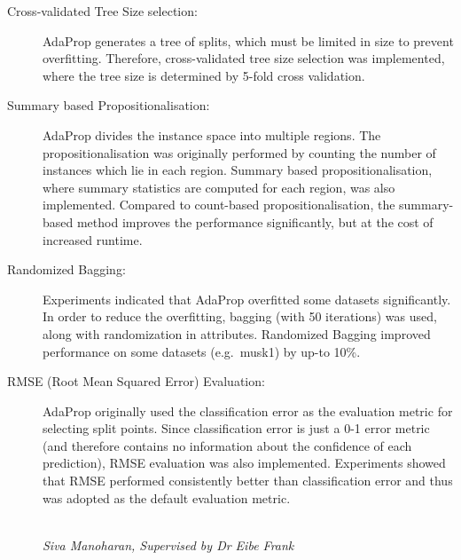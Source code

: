 \documentclass[a4paper,12pt]{article} %
\begin{document}
\begin{description}
    \item[Cross-validated Tree Size selection:]
        AdaProp generates a tree of splits, 
            which must be limited in size to prevent
            overfitting.
        Therefore, 
            cross-validated tree size selection was implemented, 
            where the tree size is determined by 
            5-fold cross validation.
            
    \item[Summary based Propositionalisation:]
        AdaProp divides the instance space into multiple regions. 
        The propositionalisation was originally
            performed by counting the number of instances which 
            lie in each region.
        Summary based propositionalisation, 
            where summary statistics are computed for each region,
            was also implemented.
        Compared to count-based propositionalisation, 
            the summary-based method
            improves the performance significantly, 
            but at the cost of increased runtime.
            
    \item[Randomized Bagging:]
        Experiments indicated that 
            AdaProp overfitted some datasets significantly.
        In order to reduce the overfitting, 
            bagging (with 50 iterations) was used, 
            along with randomization in attributes.
        Randomized Bagging improved performance on 
            some datasets (e.g.\ musk1) by up-to 10\%.
    
    \item[RMSE (Root Mean Squared Error) Evaluation:]
        AdaProp originally used the classification 
            error as the evaluation metric for selecting
            split points.
        Since classification error is just a 0-1 error 
            metric (and therefore contains no information
            about the confidence of each prediction),
        RMSE evaluation was also implemented.
        Experiments showed that RMSE performed 
            consistently better than classification error and 
            thus was adopted as the default evaluation metric.

\vfill

\begin{flushright}
~ \\ \emph{Siva Manoharan, Supervised by Dr Eibe Frank}
\end{flushright}

\end{description}


\end{document}
